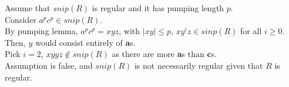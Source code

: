 \documentclass{article}
\begin{document}
\begin{enumerate}
    Assume that $snip(R)$ is regular and it has pumping length $p$.\\
    Consider $a^pc^p \in snip(R)$.\\
    By pumping lemma, $a^pc^p = xyz$, with $|xy| \leq p$, $xy^iz \in sinp(R)$ for all $i \geq 0$.\\
    Then, $y$ would consist entirely of \textbf{a}s.\\
    Pick $i = 2$, $xyyz \notin snip(R)$ as there are more \textbf{a}s than \textbf{c}s.\\
    Assumption is false, and $snip(R)$ is not necessarily regular given that $R$ is regular.
\end{enumerate}
\end{document}
